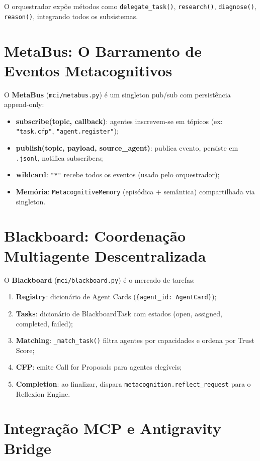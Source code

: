 O orquestrador expõe métodos como \texttt{delegate\_task()}, \texttt{research()}, \texttt{diagnose()}, \texttt{reason()}, integrando todos os subsistemas.

\section{MetaBus: O Barramento de Eventos Metacognitivos}

O \textbf{MetaBus} (\texttt{mci/metabus.py}) é um singleton pub/sub com persistência append-only:

\begin{itemize}
    \item \textbf{subscribe(topic, callback)}: agentes inscrevem-se em tópicos (ex: \texttt{"task.cfp"}, \texttt{"agent.register"});
    \item \textbf{publish(topic, payload, source\_agent)}: publica evento, persiste em \texttt{.jsonl}, notifica subscribers;
    \item \textbf{wildcard}: \texttt{"*"} recebe todos os eventos (usado pelo orquestrador);
    \item \textbf{Memória}: \texttt{MetacognitiveMemory} (episódica + semântica) compartilhada via singleton.
\end{itemize}

\section{Blackboard: Coordenação Multiagente Descentralizada}

O \textbf{Blackboard} (\texttt{mci/blackboard.py}) é o mercado de tarefas:

\begin{enumerate}
    \item \textbf{Registry}: dicionário de Agent Cards (\texttt{\{agent\_id: AgentCard\}});
    \item \textbf{Tasks}: dicionário de BlackboardTask com estados (open, assigned, completed, failed);
    \item \textbf{Matching}: \texttt{\_match\_task()} filtra agentes por capacidades e ordena por Trust Score;
    \item \textbf{CFP}: emite Call for Proposals para agentes elegíveis;
    \item \textbf{Completion}: ao finalizar, dispara \texttt{metacognition.reflect\_request} para o Reflexion Engine.
\end{enumerate}

\section{Integração MCP e Antigravity Bridge}

